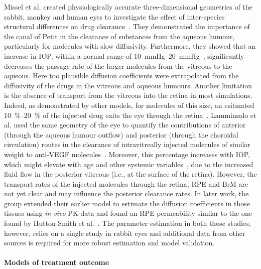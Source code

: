 \documentclass{article}
\begin{document}
Missel et al. created physiologically accurate three-dimensional geometries of the rabbit, monkey and human eyes to investigate the effect of inter-species structural differences on drug clearance~\cite{Missel_2012}.  
They demonstrated the importance of the canal of Petit in the clearance of substances from the aqueous humour, particularly for molecules with slow diffusivity. 
Furthermore, they showed that an increase in IOP, within a normal range of \SIrange[range-units = single, range-phrase={ {to} }]{10}{20}{\mmHg}~\cite{Baek_2015}, significantly decreases the passage rate of the larger molecules from the vitreous to the aqueous.
Here too plausible diffusion coefficients were extrapolated from the diffusivity of the drugs in the vitreous and aqueous humours.
Another limitation is the absence of transport from the vitreous into the retina in most simulations.
Indeed, as demonstrated by other models, for molecules of this size, an esitmated \SIrange{10}{20}{\percent} of the injected drug exits the eye through the retina~\cite{HuttonSmith_2018,Lamminsalo_2017}.
Lamminsalo et al. used the same geometry of the eye to quantify the contributions of anterior (through the aqueous humour outflow) and posterior (through the choroidal circulation) routes in the clearance of intravitreally injected molecules of similar weight to anti-VEGF molecules~\cite{Lamminsalo_2018}.
Moreover, this percentage increases with IOP, which might elevate with age and other systemic variables~\cite{Armaly_1967,Baek_2015,Hashemi_2005}, due to the increased fluid flow in the posterior vitreous (i.e., at the surface of the retina).
However, the transport rates of the injected molecules through the retina, RPE and BrM are not yet clear and may influence the posterior clearance rates.
In later work, the group extended their earlier model to estimate the diffusion coefficients in those tissues using \textit{in vivo} PK data and found an RPE permeability similar to the one found by Hutton-Smith et al.~\cite{HuttonSmith_2017, Lamminsalo_2020}.
The parameter estimation in both those studies, however, relies on a single study in rabbit eyes and additional data from other sources is required for more robust estimation and model validation.

\paragraph*{Models of treatment outcome}
\end{document}
